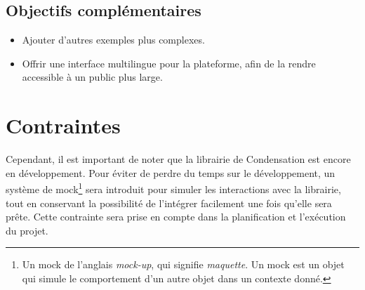 \subsection*{Objectifs \guillemotleft complémentaires\guillemotright}

\begin{itemize}
    \item Ajouter d’autres exemples plus complexes.
    \item Offrir une interface multilingue pour la plateforme, afin de la rendre accessible à un public plus large.
\end{itemize}

\section*{Contraintes}
Cependant, il est important de noter que la librairie de Condensation est encore en développement. Pour éviter de perdre du temps sur le développement, un système de mock\footnote{Un mock de l'anglais \textit{mock-up}, qui signifie \textit{maquette}. Un mock est un objet qui simule le comportement d'un autre objet dans un contexte donné.} sera introduit pour simuler les interactions avec la librairie, tout en conservant la possibilité de l'intégrer facilement une fois qu'elle sera prête. Cette contrainte sera prise en compte dans la planification et l'exécution du projet.